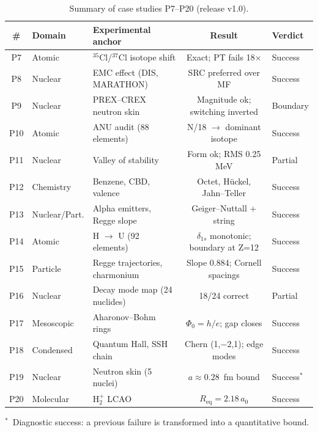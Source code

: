 \documentclass[11pt,a4paper]{article}
\begin{document}
\begin{table}[htbp]
\centering
\caption{Summary of case studies P7--P20 (release v1.0).}
\label{tab:summary1}
\begin{tabular}{@{}cllcl@{}}
\toprule
\# & Domain & Experimental anchor & Result & Verdict \\
\midrule
P7  & Atomic       & $^{35}$Cl/$^{37}$Cl isotope shift      & Exact; PT fails 18$\times$       & Success \\
P8  & Nuclear      & EMC effect (DIS, MARATHON)              & SRC preferred over MF            & Success \\
P9  & Nuclear      & PREX--CREX neutron skin                 & Magnitude ok; switching inverted & Boundary \\
P10 & Atomic       & ANU audit (88 elements)                 & N/18 $\to$ dominant isotope     & Success \\
P11 & Nuclear      & Valley of stability                     & Form ok; RMS 0.25 MeV            & Partial \\
P12 & Chemistry    & Benzene, CBD, valence                   & Octet, H\"uckel, Jahn--Teller   & Success \\
P13 & Nuclear/Part.& Alpha emitters, Regge slope             & Geiger--Nuttall + string         & Success \\
P14 & Atomic       & H $\to$ U (92 elements)                 & $\delta_{1s}$ monotonic; boundary at Z=12 & Success \\
P15 & Particle     & Regge trajectories, charmonium          & Slope 0.884; Cornell spacings    & Success \\
P16 & Nuclear      & Decay mode map (24 nuclides)            & 18/24 correct                    & Partial \\
P17 & Mesoscopic   & Aharonov--Bohm rings                    & $\Phi_0 = h/e$; gap closes       & Success \\
P18 & Condensed    & Quantum Hall, SSH chain                 & Chern (1,$-2$,1); edge modes    & Success \\
P19 & Nuclear      & Neutron skin (5 nuclei)                 & $a \approx 0.28$~fm bound       & Success$^*$ \\
P20 & Molecular    & H$_2^+$ LCAO                            & $R_{\text{eq}} = 2.18\,a_0$    & Success \\
\bottomrule
\end{tabular}
\begin{flushleft}
\small $^*$~Diagnostic success: a previous failure is transformed into a quantitative bound.
\end{flushleft}
\end{table}
\end{document}
